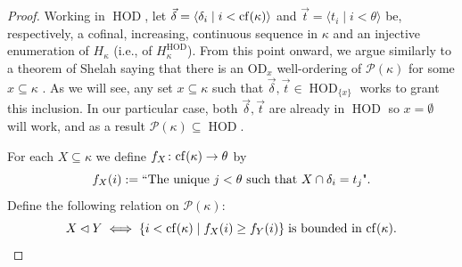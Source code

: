 \documentclass[11pt]{amsart}
\newtheorem{claim}[theorem]{Claim}
\theoremstyle{definition}
\theoremstyle{remark}
\DeclareMathOperator{\HOD}{HOD}
\newcommand{\cf}{{\rm cf}}
\def\s{\subseteq}
\begin{document}
\begin{proof}

  Working in $\HOD$, let $\vec{\delta}=\langle \delta_i\mid i<\cf(\kappa)\rangle$ and $\vec{t}=\langle t_i\mid i<\theta \rangle$ be, respectively, a cofinal, increasing, continuous sequence in $\kappa$ and an injective enumeration of $H_\kappa$ (i.e., of $H_\kappa^{\HOD}$). From this point onward, we argue similarly to a  theorem of  Shelah saying that there is an $\mathrm{OD}_x$ well-ordering of $\mathcal{P}(\kappa)$ for some $x\s \kappa$ \cite{ShelahHOD}. As we will see, any set $x\s \kappa$ such that $\vec{\delta},\vec{t}\in \HOD_{\{x\}}$ works to grant this inclusion. In our particular case,  both $\vec{\delta},\vec{t}$ are already in $\HOD$ so $x=\emptyset$ will work, and as a result $\mathcal{P}(\kappa)\s \HOD$.


   \smallskip

   For each $X\s \kappa$ we define $f_X\colon \cf(\kappa)\to \theta$  by $$\text{$f_X(i):=``$The unique $j<\theta$ such that $X\cap \delta_i=t_j$".}$$
   Define the following relation on $\mathcal{P}(\kappa)$:
   $$X\lhd Y\;\Longleftrightarrow\; \{i<\cf(\kappa)\mid f_X(i)\geq f_Y(i)\}\;\text{is bounded in $\cf(\kappa)$}.$$


\end{proof}
\end{document}

